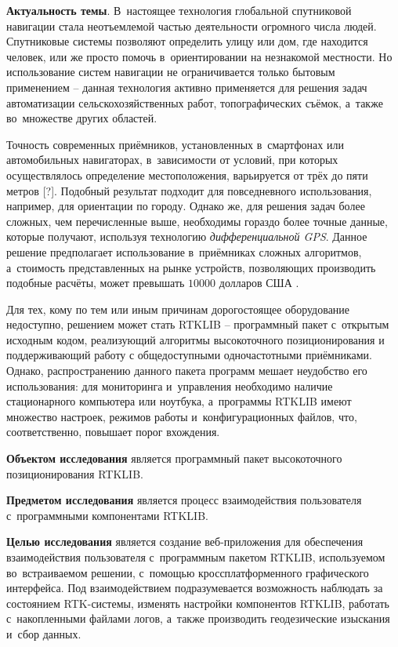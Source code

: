 
\textbf{Актуальность темы}. В~настоящее технология глобальной спутниковой навигации стала неотъемлемой частью деятельности огромного числа людей. Спутниковые системы позволяют определить улицу или дом, где находится человек, или же просто помочь в~ориентировании на незнакомой местности. Но использование систем навигации не ограничивается только бытовым применением -- данная технология активно применяется для решения задач автоматизации сельскохозяйственных работ, топографических съёмок, а~также во~множестве других областей. \par

Точность современных приёмников, установленных в~смартфонах или автомобильных навигаторах, в~зависимости от условий, при которых осуществлялось определение местоположения, варьируется от трёх до пяти метров [?]. Подобный результат подходит для повседневного использования, например, для ориентации по городу. Однако же, для решения задач более сложных, чем перечисленные выше, необходимы гораздо более точные данные, которые получают, используя технологию \textit{дифференциальной GPS}. Данное решение предполагает использование в~приёмниках сложных алгоритмов, а~стоимость представленных на рынке устройств, позволяющих производить подобные расчёты, может превышать $10000$ долларов США \cite{GEOOPTIC,JAVAD}. \par

Для тех, кому по тем или иным причинам дорогостоящее оборудование недоступно, решением может стать RTKLIB \cite{RTKLIB} -- программный пакет с~открытым исходным кодом, реализующий алгоритмы высокоточного позиционирования и поддерживающий работу с общедоступными одночастотными приёмниками. Однако, распространению данного пакета программ мешает неудобство его использования: для мониторинга и~управления необходимо наличие стационарного компьютера или ноутбука, а~программы RTKLIB имеют множество настроек, режимов работы и~конфигурационных файлов, что, соответственно, повышает порог вхождения. \par

\textbf{Объектом исследования} является программный пакет высокоточного позиционирования RTKLIB. \par

\textbf{Предметом исследования} является процесс взаимодействия пользователя с~программными компонентами RTKLIB. \par

\textbf{Целью исследования} является создание веб-приложения для обеспечения взаимодействия пользователя с~программным пакетом RTKLIB, используемом во~встраиваемом решении, с~помощью кроссплатформенного графического интерфейса. Под взаимодействием подразумевается возможность наблюдать за состоянием RTK-системы, изменять настройки компонентов RTKLIB, работать с~накопленными файлами логов, а~также производить геодезические изыскания и~сбор данных. \par

